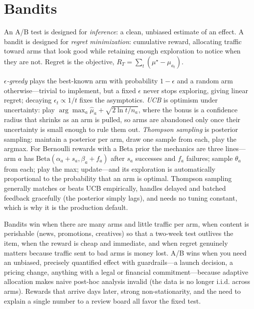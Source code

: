 \section{Bandits}
\label{cml:sec:bandits}

An A/B test is designed for \emph{inference}: a clean, unbiased estimate of an effect. A bandit is designed for \emph{regret minimization}: cumulative reward, allocating traffic toward arms that look good while retaining enough exploration to notice when they are not. Regret is the objective, $R_T = \sum_t (\mu^\star - \mu_{a_t})$.

\emph{$\epsilon$-greedy} plays the best-known arm with probability $1-\epsilon$ and a random arm otherwise---trivial to implement, but a fixed $\epsilon$ never stops exploring, giving linear regret; decaying $\epsilon_t \propto 1/t$ fixes the asymptotics. \emph{UCB} is optimism under uncertainty: play $\arg\max_a \hat\mu_a + \sqrt{2\ln t / n_a}$, where the bonus is a confidence radius that shrinks as an arm is pulled, so arms are abandoned only once their uncertainty is small enough to rule them out. \emph{Thompson sampling} is posterior sampling: maintain a posterior per arm, draw one sample from each, play the argmax. For Bernoulli rewards with a Beta prior the mechanics are three lines---arm $a$ has $\text{Beta}(\alpha_a + s_a, \beta_a + f_a)$ after $s_a$ successes and $f_a$ failures; sample $\theta_a$ from each; play the max; update---and its exploration is automatically proportional to the probability that an arm is optimal. Thompson sampling generally matches or beats UCB empirically, handles delayed and batched feedback gracefully (the posterior simply lags), and needs no tuning constant, which is why it is the production default.

Bandits win when there are many arms and little traffic per arm, when content is perishable (news, promotions, creatives) so that a two-week test outlives the item, when the reward is cheap and immediate, and when regret genuinely matters because traffic sent to bad arms is money lost. A/B wins when you need an unbiased, precisely quantified effect with guardrails---a launch decision, a pricing change, anything with a legal or financial commitment---because adaptive allocation makes naive post-hoc analysis invalid (the data is no longer i.i.d. across arms). Rewards that arrive days later, strong non-stationarity, and the need to explain a single number to a review board all favor the fixed test.

